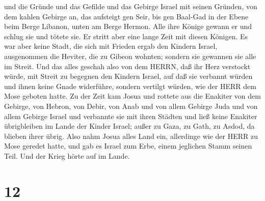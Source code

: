 und die Gründe und das Gefilde und das Gebirge Israel mit seinen
Gründen,  von dem kahlen Gebirge an, das aufsteigt gen
Seir, bis gen Baal-Gad in der Ebene beim Berge Libanon, unten am Berge
Hermon. Alle ihre Könige gewann er und schlug sie und tötete sie.
 Er stritt aber eine lange Zeit mit diesen Königen.
 Es war aber keine Stadt, die sich mit Frieden ergab den
Kindern Israel, ausgenommen die Heviter, die zu Gibeon wohnten; sondern
sie gewannen sie alle im Streit.  Und das alles geschah
also von dem HERRN, daß ihr Herz verstockt würde, mit Streit zu begegnen
den Kindern Israel, auf daß sie verbannt würden und ihnen keine Gnade
widerführe, sondern vertilgt würden, wie der HERR dem Mose geboten
hatte.  Zu der Zeit kam Josua und rottete aus die Enakiter
von dem Gebirge, von Hebron, von Debir, von Anab und von allem Gebirge
Juda und von allem Gebirge Israel und verbannte sie mit ihren Städten
 und ließ keine Enakiter übrigbleiben im Lande der Kinder
Israel; außer zu Gaza, zu Gath, zu Asdod, da blieben ihrer übrig.
 Also nahm Josua alles Land ein, allerdinge wie der HERR zu
Mose geredet hatte, und gab es Israel zum Erbe, einem jeglichen Stamm
seinen Teil. Und der Krieg hörte auf im Lande.

\hypertarget{section-11}{%
\section{12}\label{section-11}}


